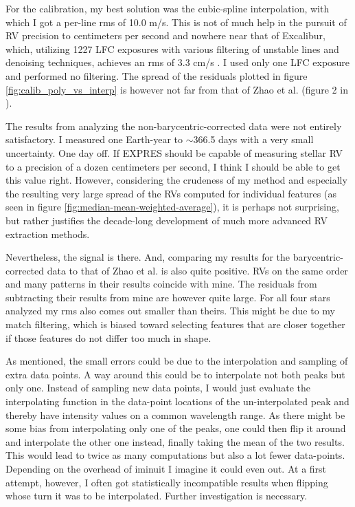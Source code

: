 For the calibration, my best solution was the cubic-spline interpolation, with which I got a per-line rms of 10.0 m/s. This is not of much help in the pursuit of RV precision to centimeters per second and nowhere near that of Excalibur, which, utilizing 1227 LFC exposures with various filtering of unstable lines and denoising techniques, achieves an rms of 3.3 cm/s \cite{zhao2021excalibur}. I used only one LFC exposure and performed no filtering. The spread of the residuals plotted in figure \ref{fig:calib_poly_vs_interp} is however not far from that of Zhao et al. (figure 2 in \cite{zhao2021excalibur}).

The results from analyzing the non-barycentric-corrected data were not entirely satisfactory. I measured one Earth-year to $\sim$366.5 days with a very small uncertainty. One day off. If EXPRES should be capable of measuring stellar RV to a precision of a dozen centimeters per second, I think I should be able to get this value right. However, considering the crudeness of my method and especially the resulting very large spread of the RVs computed for individual features (as seen in figure \ref{fig:median-mean-weighted-average}), it is perhaps not surprising, but rather justifies the decade-long development of much more advanced RV extraction methods.

Nevertheless, the signal is there. And, comparing my results for the barycentric-corrected data to that of Zhao et al. is also quite positive. RVs on the same order and many patterns in their results coincide with mine. The residuals from subtracting their results from mine are however quite large. For all four stars analyzed my rms also comes out smaller than theirs. This might be due to my match filtering, which is biased toward selecting features that are closer together if those features do not differ too much in shape.

As mentioned, the small errors could be due to the interpolation and sampling of extra data points. A way around this could be to interpolate not both peaks but only one. Instead of sampling new data points, I would just evaluate the interpolating function in the data-point locations of the un-interpolated peak and thereby have intensity values on a common wavelength range. As there might be some bias from interpolating only one of the peaks, one could then flip it around and interpolate the other one instead, finally taking the mean of the two results. This would lead to twice as many computations but also a lot fewer data-points. Depending on the overhead of iminuit I imagine it could even out. At a first attempt, however, I often got statistically incompatible results when flipping whose turn it was to be interpolated. Further investigation is necessary.

